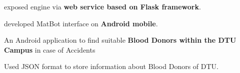 \documentclass[a4paper]{deedy-resume-openfont}
\begin{document}
\begin{minipage}[t]{0.66\textwidth}
\begin{tightemize}
 \item exposed engine via \textbf{web service based on Flask framework}.
 \item developed MatBot interface on \textbf{Android mobile}.
\end{tightemize}
\sectionsep
%
\begin{tightemize}
 \item An Android application to find suitable \textbf{Blood Donors within the DTU Campus} in case of Accidents
 \item Used JSON format to store information about Blood Donors of DTU.
\end{tightemize}
\sectionsep





%
%

\end{minipage} 
\end{document}

